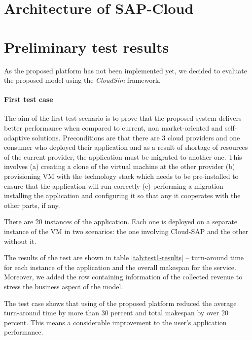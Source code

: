 \documentclass[twocolumn]{svjour3}          %
\begin{document}
\section{Architecture of SAP-Cloud}

\section{Preliminary test results}

As the proposed platform has not been implemented yet, we decided to evaluate the proposed model using the \emph{CloudSim} framework.

\paragraph{First test case} The aim of the first test scenario is to prove that the proposed system delivers better performance when compared to current, non market-oriented and self-adaptive solutions. Preconditions are that there are 3 cloud providers and one consumer who deployed their application and as a result of shortage of resources of the current provider, the application must be migrated to another one. This involves (a) creating a clone of the virtual machine at the other provider (b) provisioning VM with the technology stack which needs to be pre-installed to ensure that the application will run correctly (c) performing a migration -- installing the application and configuring it so that any it cooperates with the other parts, if any.

There are 20 instances of the application. Each one is deployed on a separate instance of the VM in two scenarios: the one involving Cloud-SAP and the other without it.

The results of the test are shown in table \ref{tab:test1-results} -- turn-around time for each instance of the application and the overall makespan for the service. Moreover, we added the row containing information of the collected revenue to stress the business aspect of the model.

The test case shows that using of the proposed platform reduced the average turn-around time by more than 30 percent and total makespan by over 20 percent. This means a considerable improvement to the user's application performance.
\end{document}
